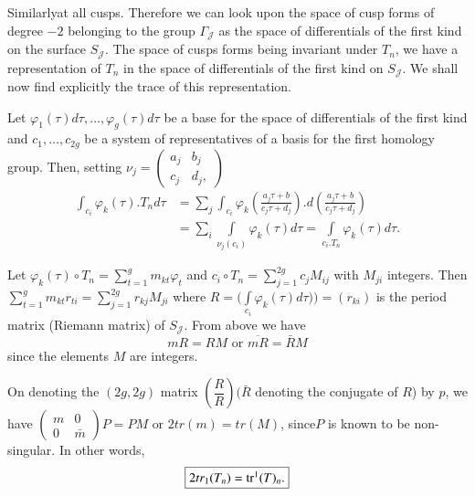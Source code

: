 Similarly\pageoriginale at all cusps. Therefore we can look upon the space of cusp
forms of degree $-2$ belonging to the group $\Gamma_ \mathcal{J}$ as
the space of differentials of the first kind on the surface
$S_{\mathcal{J}}$. The space of cusps forms being invariant under
$T_n$, we have a representation of $T_n$ in the space of differentials
of the first kind on $S_{\mathcal{J}}$. We shall now find explicitly
the trace of this representation. 

Let $\varphi_1 (\tau)d \tau,  \ldots,  \varphi_g (\tau)d \tau$ be a
base for the space of differentials of the first kind and $c_1,
\ldots,c_{2g}$ be a system of representatives of a basis for the first
homology group. Then, setting $ \nu_j = \begin{pmatrix}
  a_j&b_j\\ c_j&d_j,\end{pmatrix}$ 
\begin{align*}
  \int_{c_i}\varphi_k (\tau). T_n d\tau &= \sum_j \int_{c_i}\varphi_k
  \left(\frac{a_j\tau+b}{c_j \tau+ d_j}\right).d
  \left(\frac{a_j\tau+b}{c_j \tau+ d_j}\right)\\ 
  &=\sum_i \int \limits_{\nu_j(c_i)}\varphi_k (\tau)d \tau=\int
  \limits_{c_i.T_n}\varphi_k (\tau)d \tau. 
\end{align*}

Let $\varphi_k (\tau) \circ T_n= \sum \limits^g_{t=1}m_{kt} \varphi_t$ and
$c_i \circ T_n=\sum\limits^{2g}_{j=1} c_j M_{ij}$ with $M_{ji}$ integers. Then
$\sum\limits^g_{t=1}m_{kt}r_{ti}=\sum \limits^{2g}_{j=1}r_{kj}M_{ji}$
where $R= \bigg ( \int \limits_{c_i} \varphi_k (\tau)d \tau) \bigg
)=(r_{ki})$ is the period matrix (Riemann matrix) of $S_
\mathcal{J}$. From above we have 
$$
mR=RM \text{ or } \overline{mR}= \bar{R}M
$$
since the elements $M$ are integers.

On denoting the $(2g,2g)$ matrix $\left(\dfrac{R}{R}\right)(\bar {R}$ denoting
the conjugate of $R$) by $p$, we have $\begin{pmatrix} m&0 \\0& 
  \bar{m}\end{pmatrix} P=PM \text{ or } 2tr (m)=tr(M)$, 
since\pageoriginale $P$ is known to be non-singular. In other words,
$$
\fbox{$2tr_1 (T_n)= \operatorname{tr}^1(T)_n$.}
$$


